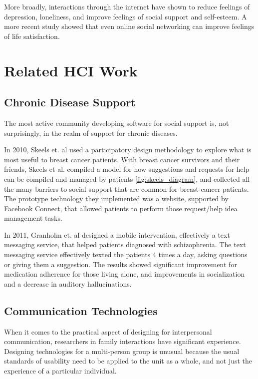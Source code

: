     More broadly, interactions through the internet have shown to reduce feelings of depression, loneliness,
    and improve feelings of social support and self-esteem.
    \cite{shaw_02}
    A more recent study showed that even online social networking can improve
    feelings of life satisfaction. \cite{hjo_14}

\section{Related HCI Work}
  \subsection{Chronic Disease Support}
    The most active community developing software for social support is,
    not surprisingly, in the realm of support for chronic diseases.

    In 2010, Skeels et. al used a participatory design methodology to explore what is most useful
    to breast cancer patients.
    With breast cancer survivors and their friends, Skeels et al. compiled a model for how
    suggestions and requests for help can be compiled and managed by patients \ref{fig:skeels_diagram},
    and collected all the many barriers to social support that are common for breast cancer patients.
    The prototype technology they implemented was a website, supported by Facebook Connect,
    that allowed patients to perform those request/help idea management tasks.
    
    In 2011, Granholm et. al designed a mobile intervention,
    effectively a text messaging service, that helped patients diagnosed with
    schizophrenia.
    The text messaging service effectively texted the patients 4 times a day,
    asking questions or giving them a suggestion.
    The results showed significant improvement for medication adherence for those living alone,
    and improvements in socialization and a decrease in auditory hallucinations. \cite{granholm_12}

  \subsection{Communication Technologies}
    When it comes to the practical aspect of designing for interpersonal
    communication, researchers in family interactions have significant experience.
    Designing technologies for a multi-person group is unusual because the usual
    standards of usability need to be applied to the unit as a whole, and not just
    the experience of a particular individual. \cite{neustaedter12}

